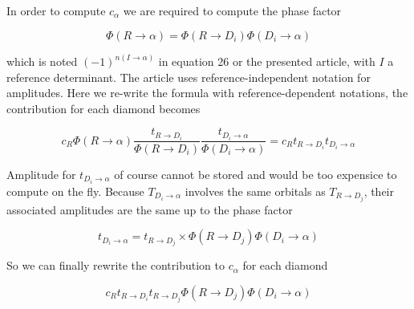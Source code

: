 \documentclass[./thesis.tex]{subfiles}
\begin{document}
In order to compute $c_\alpha$ we are required to compute the phase factor

\begin{equation}
\Phi(R \rightarrow \alpha) = \Phi(R \rightarrow D_i) \Phi(D_i \rightarrow \alpha)
\end{equation}



which is noted $(-1)^{n(I \rightarrow \alpha)}$ in equation 26 or the presented article, with $I$ a reference determinant. The article uses reference-independent notation for amplitudes. Here we re-write the formula with reference-dependent notations, the contribution for each diamond becomes

\begin{equation}
c_R \Phi(R \rightarrow \alpha) \frac{t_{R \rightarrow D_i}}{\Phi(R \rightarrow D_i)} \frac{t_{D_i \rightarrow \alpha}}{\Phi(D_i \rightarrow \alpha)} =c_R t_{R \rightarrow D_i} t_{D_i \rightarrow \alpha}
\end{equation}

Amplitude for $t_{D_i \rightarrow \alpha}$ of course cannot be stored and would be too expensice to compute on the fly. Because $T_{D_i \rightarrow \alpha}$ involves the same orbitals as $T_{R \rightarrow D_j}$, their associated amplitudes are the same up to the phase factor

\begin{equation}
t_{D_i \rightarrow \alpha} = t_{R \rightarrow D_j} \times \Phi(R \rightarrow D_j)\Phi(D_i \rightarrow \alpha)
\end{equation}

So we can finally rewrite the contribution to $c_\alpha$ for each diamond

\begin{equation}
c_R t_{R \rightarrow D_i} t_{R \rightarrow D_j} \Phi(R \rightarrow D_j)\Phi(D_i \rightarrow \alpha)
\end{equation}
\end{document}
